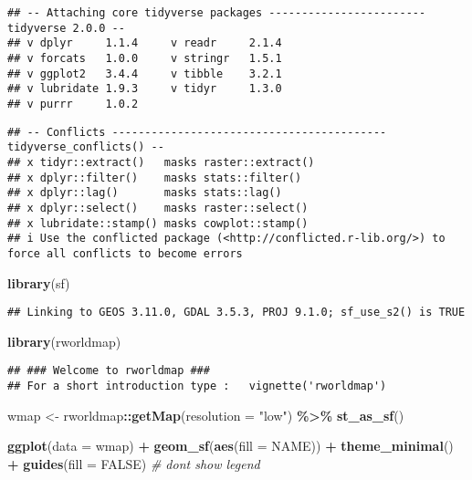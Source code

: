 \documentclass[
]{article}
\newenvironment{Shaded}{\begin{snugshade}}{\end{snugshade}}
\newcommand{\AttributeTok}[1]{\textcolor[rgb]{0.13,0.29,0.53}{#1}}
\newcommand{\CommentTok}[1]{\textcolor[rgb]{0.56,0.35,0.01}{\textit{#1}}}
\newcommand{\ConstantTok}[1]{\textcolor[rgb]{0.56,0.35,0.01}{#1}}
\newcommand{\FunctionTok}[1]{\textcolor[rgb]{0.13,0.29,0.53}{\textbf{#1}}}
\newcommand{\NormalTok}[1]{#1}
\newcommand{\OtherTok}[1]{\textcolor[rgb]{0.56,0.35,0.01}{#1}}
\newcommand{\SpecialCharTok}[1]{\textcolor[rgb]{0.81,0.36,0.00}{\textbf{#1}}}
\newcommand{\StringTok}[1]{\textcolor[rgb]{0.31,0.60,0.02}{#1}}
\begin{document}
\begin{verbatim}
## -- Attaching core tidyverse packages ------------------------ tidyverse 2.0.0 --
## v dplyr     1.1.4     v readr     2.1.4
## v forcats   1.0.0     v stringr   1.5.1
## v ggplot2   3.4.4     v tibble    3.2.1
## v lubridate 1.9.3     v tidyr     1.3.0
## v purrr     1.0.2
\end{verbatim}

\begin{verbatim}
## -- Conflicts ------------------------------------------ tidyverse_conflicts() --
## x tidyr::extract()   masks raster::extract()
## x dplyr::filter()    masks stats::filter()
## x dplyr::lag()       masks stats::lag()
## x dplyr::select()    masks raster::select()
## x lubridate::stamp() masks cowplot::stamp()
## i Use the conflicted package (<http://conflicted.r-lib.org/>) to force all conflicts to become errors
\end{verbatim}

\begin{Shaded}
\begin{Highlighting}[]
\FunctionTok{library}\NormalTok{(sf)}
\end{Highlighting}
\end{Shaded}

\begin{verbatim}
## Linking to GEOS 3.11.0, GDAL 3.5.3, PROJ 9.1.0; sf_use_s2() is TRUE
\end{verbatim}

\begin{Shaded}
\begin{Highlighting}[]
\FunctionTok{library}\NormalTok{(rworldmap)}
\end{Highlighting}
\end{Shaded}

\begin{verbatim}
## ### Welcome to rworldmap ###
## For a short introduction type :   vignette('rworldmap')
\end{verbatim}

\begin{Shaded}
\begin{Highlighting}[]
\NormalTok{wmap }\OtherTok{\textless{}{-}}\NormalTok{ rworldmap}\SpecialCharTok{::}\FunctionTok{getMap}\NormalTok{(}\AttributeTok{resolution =} \StringTok{"low"}\NormalTok{)  }\SpecialCharTok{\%\textgreater{}\%}
  \FunctionTok{st\_as\_sf}\NormalTok{()}

\FunctionTok{ggplot}\NormalTok{(}\AttributeTok{data =}\NormalTok{ wmap) }\SpecialCharTok{+}
  \FunctionTok{geom\_sf}\NormalTok{(}\FunctionTok{aes}\NormalTok{(}\AttributeTok{fill =}\NormalTok{ NAME)) }\SpecialCharTok{+}
  \FunctionTok{theme\_minimal}\NormalTok{() }\SpecialCharTok{+}
  \FunctionTok{guides}\NormalTok{(}\AttributeTok{fill =} \ConstantTok{FALSE}\NormalTok{) }\CommentTok{\# don\textquotesingle{}t show legend}
\end{Highlighting}
\end{Shaded}
\end{document}
